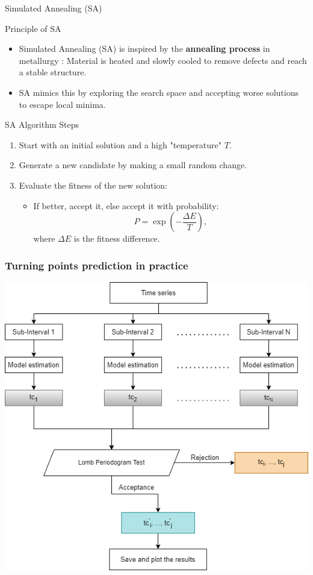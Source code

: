 \documentclass{beamer}
\begin{document}
\begin{frame}{Simulated Annealing (SA)}
    \begin{block}{Principle of SA}
        \begin{itemize}
            \item Simulated Annealing (SA) is inspired by the \textbf{annealing process} in metallurgy : Material is heated and slowly cooled to remove defects and reach a stable structure.

            \item SA mimics this by exploring the search space and accepting worse solutions to escape local minima.
        \end{itemize}
    \end{block}
    \begin{block}{SA Algorithm Steps}
        \begin{enumerate}
            \item Start with an initial solution and a high "temperature" \(T\).
            \item Generate a new candidate by making a small random change.
            \item Evaluate the fitness of the new solution:
            \begin{itemize}
                \item If better, accept it, else accept it with probability:
                \[
                P = \exp\left(-\frac{\Delta E}{T}\right),
                \]
                where \(\Delta E\) is the fitness difference.
            \end{itemize}
        \end{enumerate}
    \end{block}
\end{frame}

\begin{frame}
\frametitle{Turning points prediction in practice}
    \begin{center}
        \includegraphics[scale=0.4]{pic/processLPPL.png}
    \end{center}
\end{frame}
\end{document}
